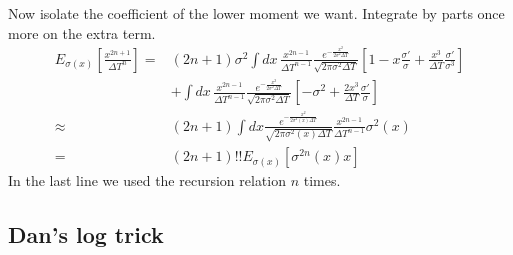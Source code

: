 Now isolate the coefficient of the lower moment we want.  Integrate by parts once more on the extra term.  
\begin{align}
 E_{\sigma(x)}\left[\frac{x^{2n+1}}{\Delta T^{n}}\right]=&(2n+1)\sigma^2\int dx\, \frac{x^{2n-1}}{\Delta T^{n-1}}\frac{e^{-\frac{x^2}{2\sigma^2\Delta T}}}{\sqrt{2\pi\sigma^2\Delta T}} \left[1 - x\frac{\sigma'}{\sigma}  + \frac{x^{3}}{\Delta T}\frac{\sigma'}{\sigma^3}\right] \nonumber \\
&+\int dx\, \frac{x^{2n-1}}{\Delta T^{n-1}}\frac{e^{-\frac{x^2}{2\sigma^2\Delta T}}}{\sqrt{2\pi\sigma^2\Delta T}} \left[-\sigma^2+ \frac{2x^{3}}{\Delta T}\frac{\sigma'}{\sigma}\right] \\
 \approx&(2n+1)\int dx \frac{e^{-\frac{x^2}{2\sigma^2(x)\Delta T}}}{\sqrt{2\pi\sigma^2(x)\Delta T}}\frac{x^{2n-1}}{\Delta T^{n-1}}\sigma^2(x)\\
=&(2n+1)!!E_{\sigma(x)}\left[\sigma^{2n}(x)x\right]
\end{align}
In the last line we used the recursion relation $n$ times.  



 \subsection{Dan's log trick}


